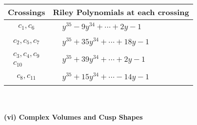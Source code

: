 \documentclass[1p]{elsarticle_modified}
\theoremstyle{definition}
\begin{document}
\begin{tabular}{m{50pt}|m{274pt}}
Crossings & \hspace{64pt}Riley Polynomials at each crossing \\
\hline $$\begin{aligned}c_{1},c_{6}\end{aligned}$$&$\begin{aligned}
&y^{35}-9 y^{34}+\cdots+2 y-1
\end{aligned}$\\
\hline $$\begin{aligned}c_{2},c_{5},c_{7}\end{aligned}$$&$\begin{aligned}
&y^{35}+35 y^{34}+\cdots+18 y-1
\end{aligned}$\\
\hline $$\begin{aligned}c_{3},c_{4},c_{9}\\c_{10}\end{aligned}$$&$\begin{aligned}
&y^{35}+39 y^{34}+\cdots+2 y-1
\end{aligned}$\\
\hline $$\begin{aligned}c_{8},c_{11}\end{aligned}$$&$\begin{aligned}
&y^{35}+15 y^{34}+\cdots-14 y-1
\end{aligned}$\\
\hline
\end{tabular}\\~\\
\newpage\flushleft \textbf{(vi) Complex Volumes and Cusp Shapes}
\end{document}

